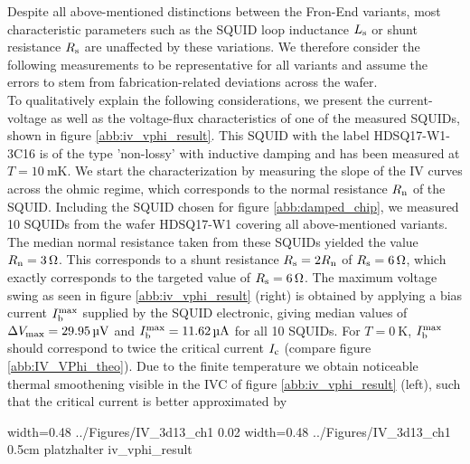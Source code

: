 Despite all above-mentioned distinctions between the Fron-End variants, most characteristic parameters such as the SQUID loop inductance $L_{\rm s}$ or shunt resistance $R_{\rm s}$ are unaffected by these variations. We therefore consider the following measurements to be representative for all variants and assume the errors to stem from fabrication-related deviations across the wafer. \\
To qualitatively explain the following considerations, we present the current-voltage as well as the voltage-flux characteristics of one of the measured SQUIDs, shown in figure \ref{abb:iv_vphi_result}. This SQUID with the label HDSQ17-W1-3C16 is of the type 'non-lossy' with inductive damping and has been measured at $T=\qty{10}{\milli\kelvin}$. We start the characterization by measuring the slope of the IV curves across the ohmic regime, which corresponds to the normal resistance $R_{\rm n}$ of the SQUID. Including the SQUID chosen for figure \ref{abb:damped_chip}, we measured 10 SQUIDs from the wafer HDSQ17-W1 covering all above-mentioned variants. The median normal resistance taken from these SQUIDs yielded the value $R_{\rm n}=\qty{3}{\ohm}$. This corresponds to a shunt resistance $R_{\rm s}=2R_{\rm n}$ of $R_{\rm s}=\qty{6}{\ohm}$, which exactly corresponds to the targeted value of $R_{\rm s}=\qty{6}{\ohm}$. The maximum voltage swing as seen in figure \ref{abb:iv_vphi_result} (right) is obtained by applying a bias current $I_{\rm b}^{\rm max}$ supplied by the SQUID electronic, giving median values of $\Delta V_{\rm max}=\qty{29.95}{\micro\volt}$ and $I_{\rm b}^{\rm max}=\qty{11.62}{\micro\ampere}$ for all 10 SQUIDs. For $T=\qty{0}{\kelvin}$, $I_{\rm b}^{\rm max}$ should correspond to twice the critical current $I_{\rm c}$ (compare figure \ref{abb:IV_VPhi_theo}). Due to the finite temperature we obtain noticeable thermal smoothening visible in the IVC of figure \ref{abb:iv_vphi_result} (left), such that the critical current is better approximated by \cite{Drung1996}

{width=0.48\textwidth}
{../Figures/IV_3d13_ch1}
{0.02\textwidth} %
{width=0.48\textwidth}
{../Figures/IV_3d13_ch1}
{0.5cm} %
{platzhalter}
{iv_vphi_result}



